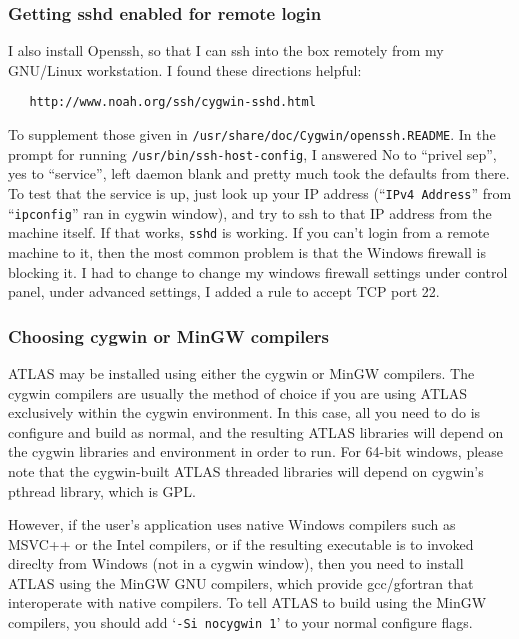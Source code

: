 \documentclass[11pt]{article}
\begin{document}
{\subsubsection{Getting sshd enabled for remote login}
I also install Openssh, so that I can ssh into the box remotely from my
GNU/Linux workstation.  I found these directions helpful:
\begin{verbatim}
   http://www.noah.org/ssh/cygwin-sshd.html
\end{verbatim}
To supplement those given in \texttt{/usr/share/doc/Cygwin/openssh.README}.
In the prompt for running {\tt /usr/bin/ssh-host-config}, I answered
No to ``privel sep'', yes to ``service'', left daemon blank and pretty
much took the defaults from there.  To test that the service is up,
just look up your IP address (``\texttt{IPv4 Address}'' from 
``\texttt{ipconfig}'' ran in cygwin window), and try to ssh to that IP
address from the machine itself.  If that works, {\tt sshd} is working.
If you can't login from a remote machine to it, then the most common
problem is that the Windows firewall is blocking it.  I had to change
to change my windows firewall settings under control panel, under advanced
settings, I added a rule to accept TCP port 22.
}

\subsubsection{Choosing cygwin or MinGW compilers}
ATLAS may be installed using either the cygwin or MinGW compilers.
The cygwin compilers are usually the method of choice if you are using
ATLAS exclusively within the cygwin environment.  In this case, all you
need to do is configure and build as normal, and the resulting ATLAS
libraries will depend on the cygwin libraries and environment in order
to run.  For 64-bit windows, please note that the cygwin-built ATLAS
threaded libraries will depend on cygwin's pthread library, which is GPL.

However, if the user's application uses native Windows compilers such as
MSVC++ or the Intel compilers, or if the resulting executable is to invoked
direclty from Windows (not in a cygwin window), then you need to install
ATLAS using the MinGW GNU compilers, which
provide gcc/gfortran that interoperate with native compilers.  To tell
ATLAS to build using the MinGW compilers, you should add
`\texttt{-Si nocygwin 1}' to your normal configure flags.
\end{document}
